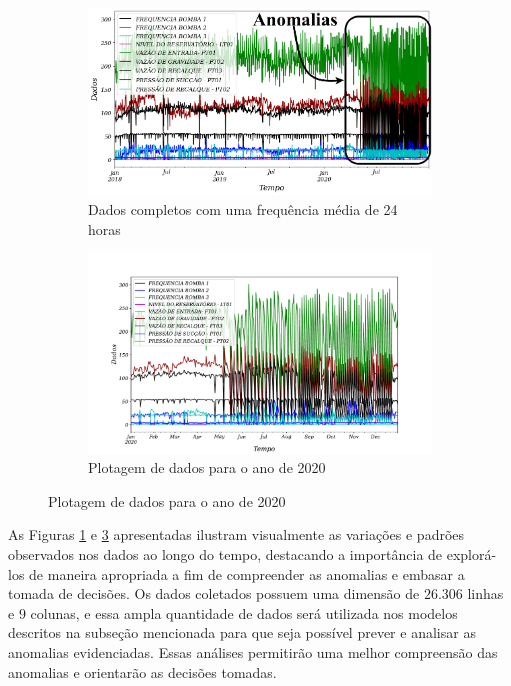 \begin{figure}[!htb]
	\centering
	\caption{Detecção de anomalias}
	\begin{subfigure}{0.9\textwidth}	
	\includegraphics[width=\linewidth]{"Introducao/Figuras/dados todos"}	
	\caption{Dados completos com uma frequência média de 24 horas}
	\label{fig:dados-todos}		
	\end{subfigure}
	
	\begin{subfigure}{0.9\textwidth}
	\includegraphics[width=\linewidth]{"Introducao/Figuras/2020 a frente"}
	\caption{Plotagem de dados para o ano de 2020}
	\label{fig:2020-a-frente}
	\end{subfigure}
	
\end{figure}



As Figuras \ref{fig:dados-todos} e \ref{fig:2020-a-frente} apresentadas ilustram visualmente as variações e padrões observados nos dados ao longo do tempo, destacando a importância de explorá-los de maneira apropriada a fim de compreender as anomalias e embasar a tomada de decisões. Os dados coletados possuem uma dimensão de $26.306$ linhas e $9$ colunas, e essa ampla quantidade de dados será utilizada nos modelos descritos na subseção mencionada para que seja possível prever e analisar as anomalias evidenciadas. Essas análises permitirão uma melhor compreensão das anomalias e orientarão as decisões tomadas.






